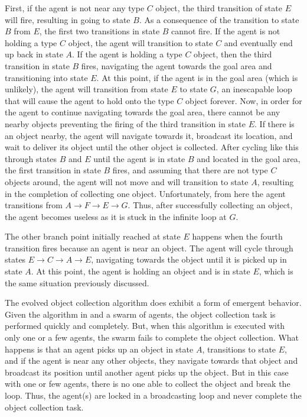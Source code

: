 First, if the agent is not near any type $C$ object, the third transition of state $E$ will fire, resulting in going to state $B$.  As a consequence of the transition to state $B$ from $E$, the first two transitions in state $B$ cannot fire.  If the agent is not holding a type $C$ object, the agent will transition to state $C$ and eventually end up back in state $A$.  If the agent is holding a type $C$ object, then the third transition in state $B$ fires, navigating the agent towards the goal area and transitioning into state $E$.  At this point, if the agent is in the goal area (which is unlikely), the agent will transition from state $E$ to state $G$, an inescapable loop that will cause the agent to hold onto the type $C$ object forever.  Now, in order for the agent to continue navigating towards the goal area, there cannot be any nearby objects preventing the firing of the third transition in state $E$.  If there is an object nearby, the agent will navigate towards it, broadcast its location, and wait to deliver its object until the other object is collected.  After cycling like this through states $B$ and $E$ until the agent is in state $B$ and located in the goal area, the first transition in state $B$ fires, and assuming that there are not type $C$ objects around, the agent will not move and will transition to state $A$, resulting in the completion of collecting one object.  Unfortunately, from here the agent transitions from $A \rightarrow F \rightarrow E \rightarrow G$.  Thus, after successfully collecting an object, the agent becomes useless as it is stuck in the infinite loop at $G$. 

The other branch point initially reached at state $E$ happens when the fourth transition fires because an agent is near an object.  The agent will cycle through states $E \rightarrow C \rightarrow A \rightarrow E$, navigating towards the object until it is picked up in state $A$.  At this point, the agent is holding an object and is in state $E$, which is the same situation previously discussed.

The evolved object collection algorithm does exhibit a form of emergent behavior.  Given the algorithm in  and a swarm of agents, the object collection task is performed quickly and completely.  But, when this algorithm is executed with only one or a few agents, the swarm fails to complete the object collection.  What happens is that an agent picks up an object in state $A$, transitions to state $E$, and if the agent is near any other objects, they navigate towards that object and broadcast its position until another agent picks up the object.  But in this case with one or few agents, there is no one able to collect the object and break the loop.  Thus, the agent(s) are locked in a broadcasting loop and never complete the object collection task.  

